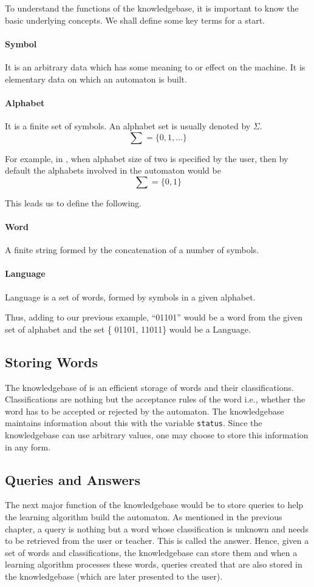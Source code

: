 	To understand the functions of the knowledgebase, it is important to know the basic underlying concepts. We shall define some key terms for a start.
	
\paragraph{Symbol} It is an arbitrary data which has some meaning to or effect on the machine. It is elementary data on which an automaton is built. 

\paragraph{Alphabet} It is a finite set of symbols. An alphabet set is usually denoted by $\Sigma$.
\vskip 1pt
\[
\sum = \{0,1,\ldots\}
\]

For example, in \libalf, when alphabet size of two is specified by the user, then by default the alphabets involved in the automaton would be 
\[
\sum = \{0,1\}
\]

This leads us to define the following.

\paragraph{Word} A finite string formed by the concatenation of a number of symbols.

\paragraph{Language} Language is a set of words, formed by symbols in a given alphabet.

Thus, adding to our previous example, ``01101'' would be a word from the given set of alphabet and the set \{ 01101, 11011\} would be a Language.

\subsection*{Storing Words} 
The knowledgebase of \libalf is an efficient storage of words and their classifications. Classifications are nothing but the acceptance rules of the word i.e., whether the word has to be accepted or rejected by the automaton. The knowledgebase maintains information about this with the variable \texttt{status}. Since the knowledgebase can use arbitrary values, one may choose to store this information in any form. 

\subsection*{Queries and Answers} 
The next major function of the knowledgebase would be to store queries to help the learning algorithm build the automaton. As mentioned in the previous chapter, a query is nothing but a word whose classification is unknown and needs to be retrieved from the user or teacher. This is called the answer. Hence, given a set of words and classifications, the knowledgebase can store them and when a learning algorithm processes these words, queries created that are also stored in the knowledgebase (which are later presented to the user).

